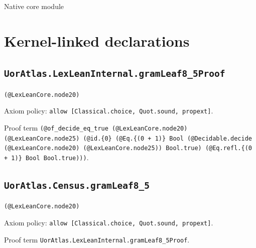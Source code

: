 \documentclass[11pt]{article}
\begin{document}
\begin{center}{\LARGE Native core module}\end{center}
\section*{Kernel-linked declarations}
\subsection*{\texttt{UorAtlas.LexLeanInternal.gramLeaf8\_5Proof}}
\noindent\texttt{(@LexLeanCore.node20)}\par
\noindent Axiom policy: \texttt{allow [Classical.choice, Quot.sound, propext]}.\par
\noindent Proof term \texttt{(@of\_decide\_eq\_true (@LexLeanCore.node20) (@LexLeanCore.node25) (@id.\{0\} (@Eq.\{(0 + 1)\} Bool (@Decidable.decide (@LexLeanCore.node20) (@LexLeanCore.node25)) Bool.true) (@Eq.refl.\{(0 + 1)\} Bool Bool.true)))}.\par
\subsection*{\texttt{UorAtlas.Census.gramLeaf8\_5}}
\noindent\texttt{(@LexLeanCore.node20)}\par
\noindent Axiom policy: \texttt{allow [Classical.choice, Quot.sound, propext]}.\par
\noindent Proof term \texttt{UorAtlas.LexLeanInternal.gramLeaf8\_5Proof}.\par
\end{document}
